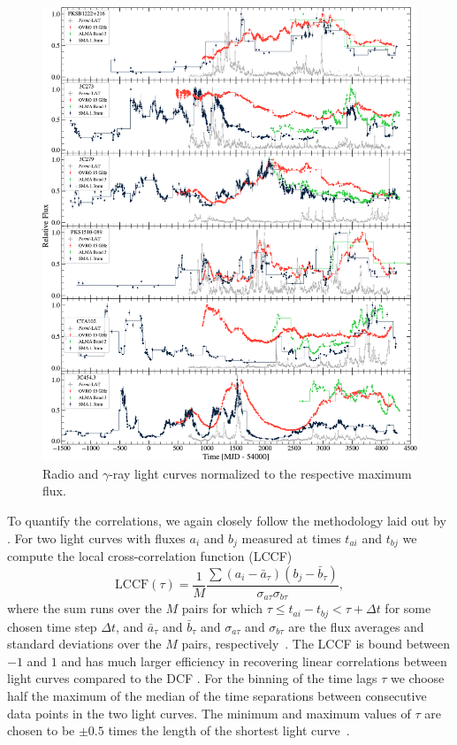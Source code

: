 \documentclass[twocolumn]{aastex62}
\newcommand{\gray}{$\gamma$-ray\xspace}
\begin{document}
\begin{figure}
    \centering
    \includegraphics[width = .8\linewidth]{lc_gamma_radio_tsmin9.pdf}
    \caption{Radio and \gray light curves normalized to the respective maximum flux.}
    \label{fig:lc-radio}
\end{figure}

To quantify the correlations, we again closely follow the methodology laid out by \citet{2014MNRAS.445..437M}. 
For two light curves with fluxes $a_i$ and $b_j$ 
measured at times $t_{ai}$ and $t_{bj}$ we compute the local cross-correlation function (LCCF)
\begin{equation}
\mathrm{LCCF}(\tau) = \frac{1}{M}\frac{\sum(a_i - \bar{a}_\tau)(b_j - \bar{b}_\tau)}{\sigma_{a\tau}\sigma_{b\tau}},
\end{equation}
where the sum runs over the $M$ pairs for which $\tau \leqslant t_{ai} - t_{bj} < \tau + \Delta t$ for some chosen time step $\Delta t$, and $\bar{a}_\tau$ and $\bar{b}_\tau$ and $\sigma_{a\tau}$ and $\sigma_{b\tau}$ are the flux averages and standard deviations over the $M$ pairs, respectively~\citep{1999PASP..111.1347W}. 
The LCCF is bound between $-1$ and $1$ and has much larger efficiency in recovering linear correlations between light curves compared to the DCF \citep{2014MNRAS.445..437M}.
For the binning of the time lags $\tau$ we choose half the maximum of the median of the time separations between consecutive data points in the two light curves.
The minimum and maximum values of $\tau$ are chosen to be $\pm0.5$ times the length of the shortest light curve~\citep{2014MNRAS.445..428M}.
\end{document}
